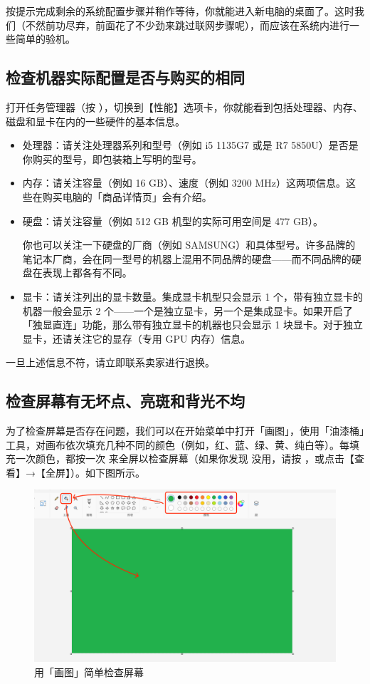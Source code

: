 按提示完成剩余的系统配置步骤并稍作等待，你就能进入新电脑的桌面了。这时我们（不然前功尽弃，前面花了不少劲来跳过联网步骤呢），而应该在系统内进行一些简单的验机。

\subsection{检查机器实际配置是否与购买的相同}

打开任务管理器（按 ），切换到【性能】选项卡，你就能看到包括处理器、内存、磁盘和显卡在内的一些硬件的基本信息。

\begin{itemize}
  \item 处理器：请关注处理器系列和型号（例如 i5 1135G7 或是 R7 5850U）是否是你购买的型号，即包装箱上写明的型号。
  \item 内存：请关注容量（例如 16 GB）、速度（例如 3200 MHz）这两项信息。这些在购买电脑的「商品详情页」会有介绍。
  \item 硬盘：请关注容量（例如 512 GB 机型的实际可用空间是 477 GB）。
    \begin{note}
      你也可以关注一下硬盘的厂商（例如 SAMSUNG）和具体型号。许多品牌的笔记本厂商，会在同一型号的机器上混用不同品牌的硬盘——而不同品牌的硬盘在表现上都各有不同。
    \end{note}
  \item 显卡：请关注列出的显卡数量。集成显卡机型只会显示 1 个，带有独立显卡的机器一般会显示 2 个——一个是独立显卡，另一个是集成显卡。如果开启了「独显直连」功能，那么带有独立显卡的机器也只会显示 1 块显卡。对于独立显卡，还请关注它的显存（专用 GPU 内存）信息。
\end{itemize}

一旦上述信息不符，请立即联系卖家进行退换。

\subsection{检查屏幕有无坏点、亮斑和背光不均}

为了检查屏幕是否存在问题，我们可以在开始菜单中打开「画图」，使用「油漆桶」工具，对画布依次填充几种不同的颜色（例如，红、蓝、绿、黄、纯白等）。每填充一次颜色，都按一次  来全屏以检查屏幕（如果你发现  没用，请按 ，或点击【查看】→【全屏】）。如下图所示。

\begin{figure}[htb!]
  \centering
  \includegraphics[width=.75\textwidth]{assets/appendix/Paint.png}
  \caption{用「画图」简单检查屏幕}
  \label{fig:Paint}
\end{figure}

